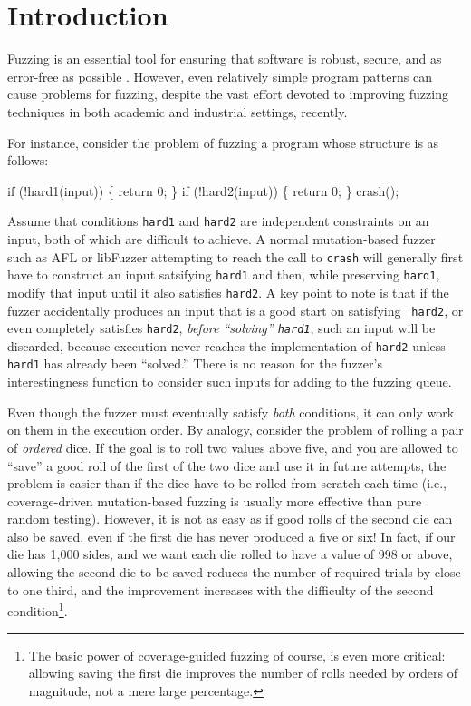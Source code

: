 \section{Introduction}

Fuzzing is an essential tool for ensuring that software is robust, secure, and as error-free as possible \cite{ArtFuzz}.  However, even relatively simple program patterns can cause problems for fuzzing, despite the vast effort devoted to improving fuzzing techniques in both academic and industrial settings, recently.

For instance, consider the problem of fuzzing a program whose structure is as
follows:

\begin{code}
  if (!hard1(input)) \{
      return 0;
  \}
  if (!hard2(input)) \{
      return 0;
  \}
  crash();   
\end{code}

Assume that conditions {\tt hard1} and {\tt hard2} are independent
constraints on an input, both of which are difficult to achieve.  A
normal mutation-based
fuzzer such as AFL or libFuzzer attempting to reach the call to {\tt crash} will generally
first have to construct an input satsifying {\tt hard1} and then,
while preserving {\tt hard1}, modify that input until it also
satisfies {\tt hard2}.  A key point to note is that if the fuzzer
accidentally produces an input that is a good start on satisfying {\tt
  hard2}, or even completely satisfies {\tt hard2}, \emph{before
  ``solving'' {\tt hard1}}, such an input will
be discarded, because execution never reaches the implementation of
{\tt hard2} unless {\tt hard1} has already been ``solved.''  There is
no reason for the fuzzer's interestingness function to consider such
inputs for adding to the fuzzing queue.

Even
though the fuzzer must eventually satisfy \emph{both} conditions, it can only
work on them in the execution order.  By analogy, consider the problem
of rolling a pair of \emph{ordered} dice.  If the goal is to roll two values above
five, and you are allowed to ``save'' a good roll of the first of the
two dice and use it in future attempts, the problem is easier than if
the dice have to be rolled from scratch each time (i.e.,
coverage-driven mutation-based fuzzing is usually more effective than
pure random testing).  However, it is not
as easy as if good rolls of the second die can also be saved, even if the first
die has never produced a five or six!  In fact, if our die has 1,000
sides, and we want each die rolled to have a value of 998 or above,
allowing the second die to be saved reduces the number of required
trials by close to one third, and the improvement increases with the
difficulty of the second condition\footnote{The basic power of
  coverage-guided fuzzing of course, is even more critical: allowing
  saving the first die improves the number of rolls needed by orders
  of magnitude, not a mere large percentage.}.

